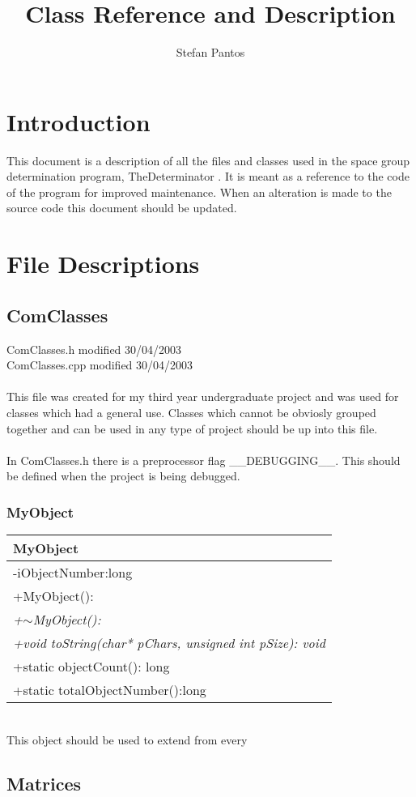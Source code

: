 \documentclass[11pt]{article}
\title{Class Reference and Description}
\author{Stefan Pantos}
\begin{document}
\maketitle
\section{Introduction}
This document is a description of all the files and classes used in the space group determination program, TheDeterminator . It is meant as a reference to the code of the program for improved maintenance. When an alteration is made to the source code this document should be updated.
\section{File Descriptions}
\subsection{ComClasses}
{\footnotesize ComClasses.h modified  30/04/2003 \\ ComClasses.cpp modified 30/04/2003}\\\\
This file was created for my third year undergraduate project and was used for classes which had a general use. Classes which cannot be obviosly grouped together and can be used in any type of project should be up into this file.\\\\
In ComClasses.h there is a preprocessor flag __DEBUGGING__. This should be defined when the project is being debugged.
\subsubsection{MyObject}
\begin{table}[h]
\begin{tabular}{|l|}\hline
\textbf{MyObject}\\ \hline
-iObjectNumber:long\\
\hline
+MyObject():\\
\textit{+$\sim$MyObject():}\\
\textit{+void toString(char* pChars, unsigned int pSize): void}\\
+static objectCount(): long\\
+static totalObjectNumber():long\\
\hline
\end{tabular}
\label{default}
\end{table}\\
This object should be used to extend from every

\subsection{Matrices}

 
\end{document}
